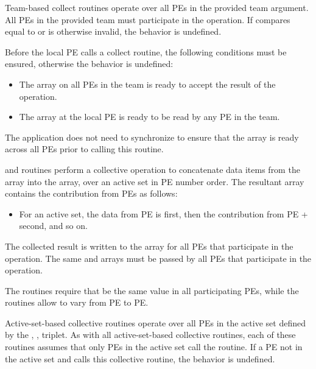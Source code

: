 \begin{apidefinition}
{    Team-based collect routines operate over all \acp{PE} in the provided team argument. All
    \acp{PE} in the provided team must participate in the operation.
    If  compares equal to  or is
    otherwise invalid, the behavior is undefined.

    Before the local \ac{PE} calls a collect routine, the following conditions must
    be ensured, otherwise the behavior is undefined:
    \begin{itemize}
        \item The \dest{} array on all \acp{PE} in the team is ready to
            accept the result of the operation.
        \item The \source{} array at the local \ac{PE} is ready to be read
            by any \ac{PE} in the team.
    \end{itemize}
    The application does not need to synchronize to ensure that the \source{}
    array is ready across all \acp{PE} prior to calling this routine.

\begin{DeprecateBlock}
    \openshmem {} and  routines perform a collective
    operation to concatenate 
    data items from the \source{} array into the
    \dest{} array, over an \openshmem active set
    in \ac{PE} number order. The resultant \dest{} array contains the contribution from
	\acp{PE} as follows:
    \begin{itemize}
        \item For an active set, the data from \ac{PE}  is first, then the
   	contribution from \ac{PE}  +  second, and so on.
    \end{itemize}

    The collected result is written to the \dest{} array for all \acp{PE}
    that participate in the operation. The same \dest{} and \source{}
    arrays must be passed by all \acp{PE} that participate in the operation.
    
    The  routines require that  be the same value in all
    participating \acp{PE}, while the  routines allow  to
    vary from \ac{PE} to \ac{PE}.

    Active-set-based collective routines operate over all \acp{PE} in the active set
    defined by the , ,  triplet.
    As with all active-set-based collective routines,
    each of these routines assumes that
    only \acp{PE} in the active set call the routine. If a \ac{PE} not in the
    active set and calls this collective routine, the behavior is undefined.


\end{DeprecateBlock}}
\end{apidefinition}
